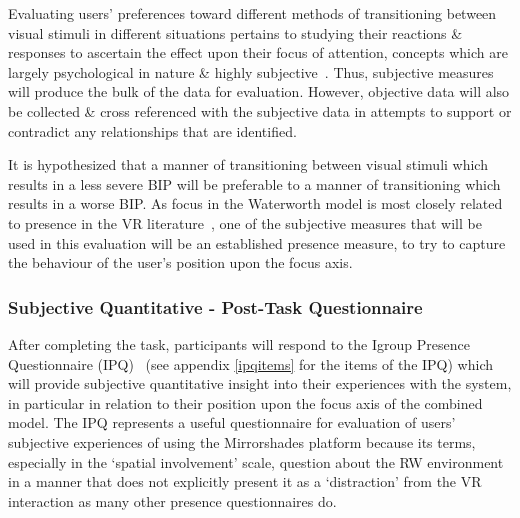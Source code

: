 Evaluating users' preferences toward different methods of transitioning between visual stimuli in different situations pertains to studying their reactions \& responses to ascertain the effect upon their focus of attention, concepts which are largely psychological in nature \& highly subjective~\cite{Ijsselsteijn2001}. Thus, subjective measures will produce the bulk of the data for evaluation. However, objective data will also be collected \& cross referenced with the subjective data in attempts to support or contradict any relationships that are identified.

It is hypothesized that a manner of transitioning between visual stimuli which results in a less severe BIP will be preferable to a manner of transitioning which results in a worse BIP. As focus in the Waterworth model is most closely related to presence in the VR literature~\cite{Waterworth2001}, one of the subjective measures that will be used in this evaluation will be an established presence measure, to try to capture the behaviour of the user's position upon the focus axis.

\subsubsection{Subjective Quantitative - Post-Task Questionnaire}
After completing the task, participants will respond to the Igroup Presence Questionnaire (IPQ)~\cite{Schubert2001} (see appendix \ref{ipqitems} for the items of the IPQ) which will provide subjective quantitative insight into their experiences with the system, in particular in relation to their position upon the focus axis of the combined model. The IPQ represents a useful questionnaire for evaluation of users' subjective experiences of using the Mirrorshades platform because its terms, especially in the `spatial involvement' scale, question about the RW environment in a manner that does not explicitly present it as a `distraction' from the VR interaction as many other presence questionnaires do.


